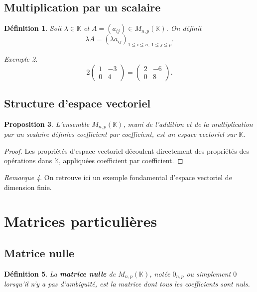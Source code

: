 \documentclass[11pt,a4paper]{article}
\newtheorem{definition}{Définition}[section]
\newtheorem{proposition}[definition]{Proposition}
\theoremstyle{remark}
\newtheorem{remarque}[definition]{Remarque}
\newtheorem{exemple}[definition]{Exemple}
\newcommand{\K}{\mathbb{K}}
\begin{document}
\subsection{Multiplication par un scalaire}

\begin{definition}
Soit \(\lambda\in \K\) et \(A=(a_{ij})\in M_{n,p}(\K)\).  
On définit
\[
\lambda A=(\lambda a_{ij})_{1\le i\le n,\ 1\le j\le p}.
\]
\end{definition}

\begin{exemple}
\[
2\begin{pmatrix}
1 & -3\\
0 & 4
\end{pmatrix}
=
\begin{pmatrix}
2 & -6\\
0 & 8
\end{pmatrix}.
\]
\end{exemple}

\subsection{Structure d’espace vectoriel}

\begin{proposition}
L’ensemble \(M_{n,p}(\K)\), muni de l’addition et de la multiplication par un scalaire définies coefficient par coefficient, est un espace vectoriel sur \(\K\).
\end{proposition}

\begin{proof}
Les propriétés d’espace vectoriel découlent directement des propriétés des opérations dans \(\K\), appliquées coefficient par coefficient.
\end{proof}

\begin{remarque}
On retrouve ici un exemple fondamental d’espace vectoriel de dimension finie.
\end{remarque}

\section{Matrices particulières}

\subsection{Matrice nulle}

\begin{definition}
La \textbf{matrice nulle} de \(M_{n,p}(\K)\), notée \(0_{n,p}\) ou simplement \(0\) lorsqu’il n’y a pas d’ambiguïté, est la matrice dont tous les coefficients sont nuls.
\end{definition}
\end{document}
